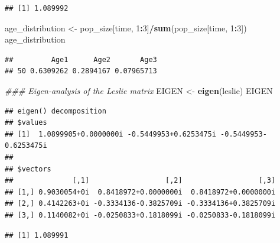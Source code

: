 \documentclass[
]{book}
\newenvironment{Shaded}{\begin{snugshade}}{\end{snugshade}}
\newcommand{\CommentTok}[1]{\textcolor[rgb]{0.56,0.35,0.01}{\textit{#1}}}
\newcommand{\DecValTok}[1]{\textcolor[rgb]{0.00,0.00,0.81}{#1}}
\newcommand{\KeywordTok}[1]{\textcolor[rgb]{0.13,0.29,0.53}{\textbf{#1}}}
\newcommand{\NormalTok}[1]{#1}
\newcommand{\OperatorTok}[1]{\textcolor[rgb]{0.81,0.36,0.00}{\textbf{#1}}}
\newcommand{\StringTok}[1]{\textcolor[rgb]{0.31,0.60,0.02}{#1}}
\begin{document}
\begin{verbatim}
## [1] 1.089992
\end{verbatim}

\begin{Shaded}
\begin{Highlighting}[]
\NormalTok{age_distribution <-}\StringTok{ }\NormalTok{pop_size[time, }\DecValTok{1}\OperatorTok{:}\DecValTok{3}\NormalTok{]}\OperatorTok{/}\KeywordTok{sum}\NormalTok{(pop_size[time, }\DecValTok{1}\OperatorTok{:}\DecValTok{3}\NormalTok{])}
\NormalTok{age_distribution}
\end{Highlighting}
\end{Shaded}

\begin{verbatim}
##         Age1      Age2       Age3
## 50 0.6309262 0.2894167 0.07965713
\end{verbatim}

\begin{Shaded}
\begin{Highlighting}[]
\CommentTok{### Eigen-analysis of the Leslie matrix}
\NormalTok{EIGEN <-}\StringTok{ }\KeywordTok{eigen}\NormalTok{(leslie)}
\NormalTok{EIGEN}
\end{Highlighting}
\end{Shaded}

\begin{verbatim}
## eigen() decomposition
## $values
## [1]  1.0899905+0.0000000i -0.5449953+0.6253475i -0.5449953-0.6253475i
## 
## $vectors
##              [,1]                  [,2]                  [,3]
## [1,] 0.9030054+0i  0.8418972+0.0000000i  0.8418972+0.0000000i
## [2,] 0.4142263+0i -0.3334136-0.3825709i -0.3334136+0.3825709i
## [3,] 0.1140082+0i -0.0250833+0.1818099i -0.0250833-0.1818099i
\end{verbatim}

\begin{Shaded}
\end{Shaded}

\begin{verbatim}
## [1] 1.089991
\end{verbatim}

\begin{Shaded}
\end{Shaded}
\end{document}
